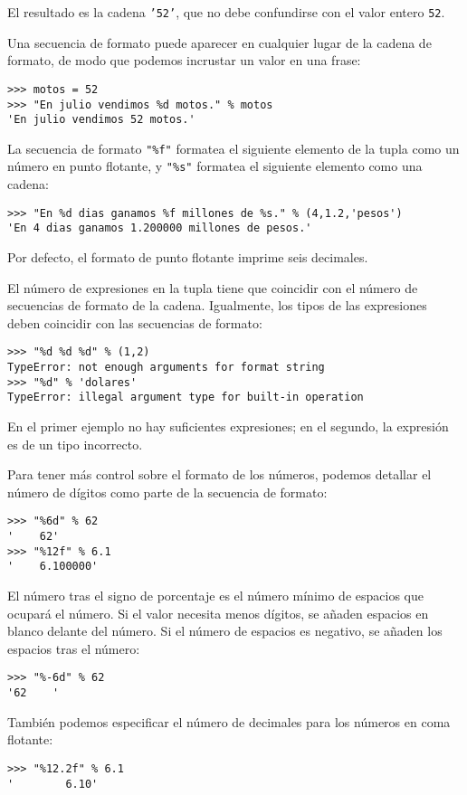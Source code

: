 El resultado es la cadena \texttt{'52'}, que no debe confundirse con
el valor entero \texttt{52}.

Una secuencia de formato puede aparecer en cualquier lugar de la cadena
de formato, de modo que podemos incrustar un valor en una frase:
\begin{lstlisting}
>>> motos = 52
>>> "En julio vendimos %d motos." % motos
'En julio vendimos 52 motos.'
\end{lstlisting}

La secuencia de formato {\verb+"%f"+} formatea el siguiente elemento
de la tupla como un número en punto flotante, y {\verb+"%s"+} formatea
el siguiente elemento como una cadena:
\begin{lstlisting}
>>> "En %d dias ganamos %f millones de %s." % (4,1.2,'pesos')
'En 4 dias ganamos 1.200000 millones de pesos.'
\end{lstlisting}

Por defecto, el formato de punto flotante imprime seis decimales.

El número de expresiones en la tupla tiene que coincidir con el número
de secuencias de formato de la cadena. Igualmente, los tipos de las
expresiones deben coincidir con las secuencias de formato:

\begin{lstlisting}
>>> "%d %d %d" % (1,2)
TypeError: not enough arguments for format string
>>> "%d" % 'dolares'
TypeError: illegal argument type for built-in operation
\end{lstlisting}

En el primer ejemplo no hay suficientes expresiones; en el segundo,
la expresión es de un tipo incorrecto.

Para tener más control sobre el formato de los números, podemos detallar
el número de dígitos como parte de la secuencia de formato:
\begin{lstlisting}
>>> "%6d" % 62
'    62'
>>> "%12f" % 6.1
'    6.100000'
\end{lstlisting}

El número tras el signo de porcentaje es el número mínimo de espacios
que ocupará el número. Si el valor necesita menos dígitos, se añaden
espacios en blanco delante del número. Si el número de espacios es
negativo, se añaden los espacios tras el número:
\begin{lstlisting}
>>> "%-6d" % 62
'62    '
\end{lstlisting}

También podemos especificar el número de decimales para los números
en coma flotante:
\begin{lstlisting}
>>> "%12.2f" % 6.1
'        6.10'
\end{lstlisting}

